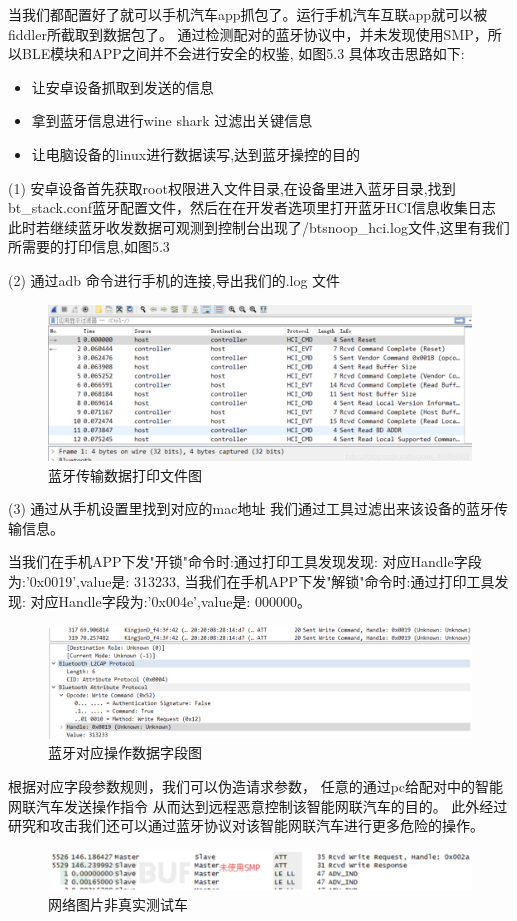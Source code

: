 当我们都配置好了就可以手机汽车app抓包了。运行手机汽车互联app就可以被fiddler所截取到数据包了。
通过检测配对的蓝牙协议中，并未发现使用SMP，所以BLE模块和APP之间并不会进行安全的权鉴, 如图5.3
具体攻击思路如下:
\begin{itemize}
    \item 让安卓设备抓取到发送的信息
    \item 拿到蓝牙信息进行wine shark 过滤出关键信息
    \item 让电脑设备的linux进行数据读写,达到蓝牙操控的目的
\end{itemize}

(1) 安卓设备首先获取root权限进入文件目录,在设备里进入蓝牙目录,找到bt\_stack.conf蓝牙配置文件，然后在在开发者选项里打开蓝牙HCI信息收集日志
此时若继续蓝牙收发数据可观测到控制台出现了/btsnoop\_hci.log文件,这里有我们所需要的打印信息,如图5.3

(2) 通过adb 命令进行手机的连接,导出我们的.log 文件
\begin{figure}
    \centering
    \includegraphics[scale=0.5]{resources/img/i17.png}
    \caption{蓝牙传输数据打印文件图}
  \end{figure}
(3) 通过从手机设置里找到对应的mac地址 我们通过工具过滤出来该设备的蓝牙传输信息。
  
当我们在手机APP下发"开锁"命令时:通过打印工具发现发现:
对应Handle字段为:'0x0019',value是: 313233,
当我们在手机APP下发"解锁"命令时:通过打印工具发现:
对应Handle字段为:'0x004e',value是: 000000。
\begin{figure}
    \centering
    \includegraphics[scale=0.5]{resources/img/i18.png}
    \caption{蓝牙对应操作数据字段图}
  \end{figure}
根据对应字段参数规则，我们可以伪造请求参数，
任意的通过pc给配对中的智能网联汽车发送操作指令
从而达到远程恶意控制该智能网联汽车的目的。
此外经过研究和攻击我们还可以通过蓝牙协议对该智能网联汽车进行更多危险的操作。
\begin{figure}
    \centering
    \includegraphics[scale=0.5]{resources/img/i16.png}
    \caption{网络图片非真实测试车}
  \end{figure}


